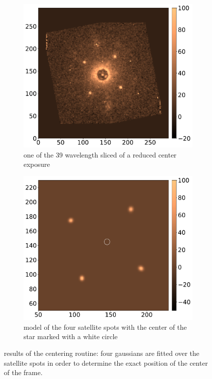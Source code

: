 \documentclass[twoside,single]{lion-msc}
\begin{document}
\begin{figure}[htb]
\centering
\begin{subfigure}{.5\textwidth}
  \centering
  \includegraphics[width=1\linewidth]{centerframe}
  \caption{one of the 39 wavelength sliced of a reduced center exposure\\}
  \label{fig:centerframe}
\end{subfigure}%
\begin{subfigure}{.5\textwidth}
  \centering
  \includegraphics[width=1\linewidth]{centermodel}%
  \caption{model of the four satellite spots with the center of the star marked with a white circle}
  \label{fig:centermodel}
\end{subfigure}
\caption{results of the centering routine: four gaussians are fitted over the satellite spots in order to determine the exact position of the center of the frame.}
\end{figure}
\end{document}

